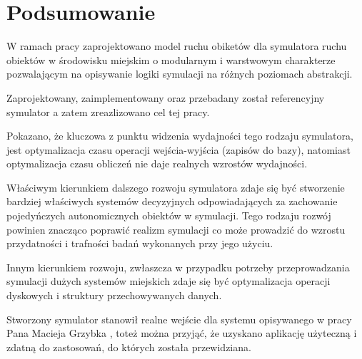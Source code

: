 \chapter{Podsumowanie}
\par{
W ramach pracy zaprojektowano model ruchu obiketów dla symulatora ruchu obiektów w środowisku miejskim o modularnym i warstwowym charakterze pozwalającym na opisywanie logiki symulacji na różnych poziomach abstrakcji.
}
\par{
Zaprojektowany, zaimplementowany oraz przebadany został referencyjny symulator a zatem zreazlizowano cel tej pracy.
}
\par{
Pokazano, że kluczowa z punktu widzenia wydajności tego rodzaju symulatora, jest optymalizacja czasu operacji wejścia-wyjścia (zapisów do bazy), natomiast optymalizacja czasu obliczeń nie daje realnych wzrostów wydajności.
}
\par{
Właściwym kierunkiem dalszego rozwoju symulatora zdaje się być stworzenie bardziej właściwych systemów decyzyjnych odpowiadających za zachowanie pojedyńczych autonomicznych obiektów w symulacji. Tego rodzaju rozwój powinien znacząco poprawić realizm symulacji co może prowadzić do wzrostu przydatności i trafności badań wykonanych przy jego użyciu.
}
\par{
Innym kierunkiem rozwoju, zwłaszcza w przypadku potrzeby przeprowadzania symulacji dużych systemów miejskich zdaje się być optymalizacja operacji dyskowych i struktury przechowywanych danych.
}
\par{
Stworzony symulator stanowił realne wejście dla systemu opisywanego w pracy Pana Macieja Grzybka \cite{Grzybek}, toteż można przyjąć, że uzyskano aplikację użyteczną i zdatną do zastosowań, do których została przewidziana.
}